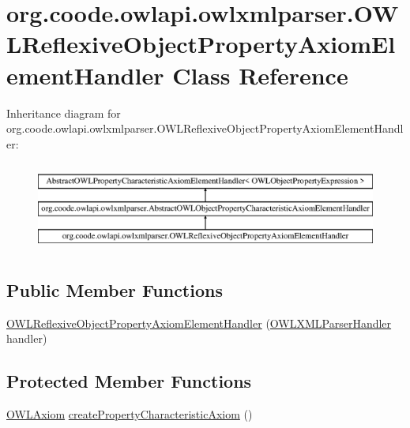 \hypertarget{classorg_1_1coode_1_1owlapi_1_1owlxmlparser_1_1_o_w_l_reflexive_object_property_axiom_element_handler}{\section{org.\-coode.\-owlapi.\-owlxmlparser.\-O\-W\-L\-Reflexive\-Object\-Property\-Axiom\-Element\-Handler Class Reference}
\label{classorg_1_1coode_1_1owlapi_1_1owlxmlparser_1_1_o_w_l_reflexive_object_property_axiom_element_handler}
}
Inheritance diagram for org.\-coode.\-owlapi.\-owlxmlparser.\-O\-W\-L\-Reflexive\-Object\-Property\-Axiom\-Element\-Handler\-:\begin{figure}[H]
\begin{center}
\leavevmode
\includegraphics[height=2.984014cm]{classorg_1_1coode_1_1owlapi_1_1owlxmlparser_1_1_o_w_l_reflexive_object_property_axiom_element_handler}
\end{center}
\end{figure}
\subsection*{Public Member Functions}
\begin{DoxyCompactItemize}
\item 
\hyperlink{classorg_1_1coode_1_1owlapi_1_1owlxmlparser_1_1_o_w_l_reflexive_object_property_axiom_element_handler_a2b6e13c4d6eddcc4d11b5ca26c320ed1}{O\-W\-L\-Reflexive\-Object\-Property\-Axiom\-Element\-Handler} (\hyperlink{classorg_1_1coode_1_1owlapi_1_1owlxmlparser_1_1_o_w_l_x_m_l_parser_handler}{O\-W\-L\-X\-M\-L\-Parser\-Handler} handler)
\end{DoxyCompactItemize}
\subsection*{Protected Member Functions}
\begin{DoxyCompactItemize}
\item 
\hyperlink{interfaceorg_1_1semanticweb_1_1owlapi_1_1model_1_1_o_w_l_axiom}{O\-W\-L\-Axiom} \hyperlink{classorg_1_1coode_1_1owlapi_1_1owlxmlparser_1_1_o_w_l_reflexive_object_property_axiom_element_handler_a260c5bbf0137840d2e2c7950a833d6d5}{create\-Property\-Characteristic\-Axiom} ()
\end{DoxyCompactItemize}


